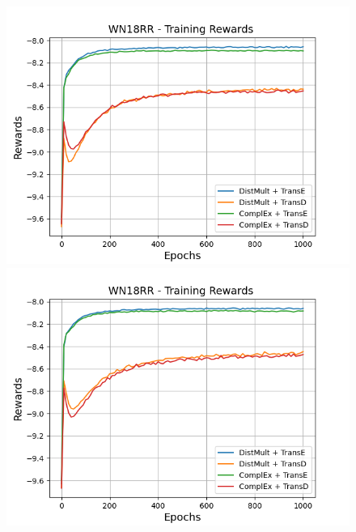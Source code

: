 \begin{figure}[H]
    \centering
    \begin{minipage}{.45\textwidth}
      \centering
      \includegraphics[width=0.9\linewidth]{figures/results/gan_train/not_pretrained/uncertainty/max_distribution/entropy/wn18rr/1k_epochs/uncertainty_wn18rr_rew.png}
    \end{minipage}%
    \begin{minipage}{.45\textwidth}
      \centering
      \includegraphics[width=0.9\linewidth]{figures/results/gan_train/not_pretrained/uncertainty/max_distribution/least_confidence/wn18rr/uncertainty_wn18rr_rew.png}
    \end{minipage}
    \begin{minipage}{.45\textwidth}
      \centering

\end{minipage}
\end{figure}
